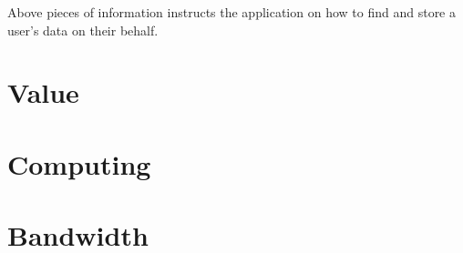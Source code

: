 		Above pieces of information instructs the application on how to find and store a user's data on their behalf.
	
\section{Value}
	
\section{Computing}
	
\section{Bandwidth}